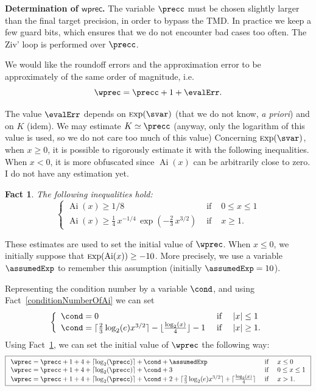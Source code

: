 \documentclass[12pt]{amsart}
\DeclareMathOperator{\Ai}{Ai}
\def\Exp{{\rm \textsc exp}}
\newtheorem{fact}{Fact}
\begin{document}
\noindent\textbf{Determination of $\mathsf{wprec}$.}
\label{linkBetweenPrec}
The variable $\precc$ must be chosen slightly larger than the final target precision, in order to bypass the TMD. In practice we keep a few guard bits, which ensures that we do not encounter bad cases too often. The Ziv' loop is performed over $\precc$.

We would like the roundoff errors and the approximation error to be approximately of the same order of magnitude, i.e.
$$ \wprec = \precc + 1 + \evalErr.$$

The value $\evalErr$ depends on $\Exp(\svar)$ (that we do not know, \emph{a priori}) and on $K$ (idem). We may estimate $K \simeq \precc$ (anyway, only the logarithm of this value is used, so we do not care too much of this value)
Concerning $\Exp(\svar)$, when $x \ge 0$, it is possible to rigorously estimate it with the following inequalities. When $x<0$, it is more obfuscated since $\Ai(x)$ can be arbitrarily close to zero. I do not have any estimation yet.

\begin{fact}
  \label{orderOfMagnitudeAi}
  The following inequalities hold:
$$
\left\{
\begin{array}{ccl}
  \Ai(x) \ge 1/8 & \text{ if } &0\le x\le 1\\
  \Ai(x) \ge \frac{1}{4}\,x^{-1/4}\,\exp\left(-\frac{2}{3} \, x^{3/2}\right) & \text{ if } &x\ge 1.
\end{array}
\right.
$$
\end{fact}


These estimates are used to set the initial value of $\wprec$. When $x \le 0$, we initially suppose that $\Exp(\Ai(x)) \ge -10$. More precisely, we use a variable $\assumedExp$ to remember this assumption (initially $\assumedExp=10$).

Representing the condition number by a variable $\cond$, and using Fact~\ref{conditionNumberOfAi} we can set
$$
\left\{
\begin{array}{lcl}
  \cond = 0 & \text{ if } & |x| \le 1\\
  \cond = \lceil\frac{2}{3}\log_2(e)x^{3/2}\rceil - \lfloor\frac{\log_2(x)}{4}\rfloor - 1 & \text{ if } & |x|\ge 1.
\end{array}
\right.
$$
Using Fact~\ref{orderOfMagnitudeAi}, we can set the initial value of $\wprec$ the following way:
$$
\boxed{
\begin{array}{ll}
  \wprec = \precc + 1 + 4 + \lceil \log_2(\precc)\rceil + \cond + \assumedExp & \text{ if }\quad x \le 0\\
  \wprec = \precc + 1 + 4 + \lceil \log_2(\precc)\rceil + \cond + 3 & \text{ if }\quad  0 \le x \le 1\\
  \wprec = \precc + 1 + 4 + \lceil \log_2(\precc)\rceil + \cond + 2 + \lceil\frac{2}{3}\log_2(e)x^{3/2}\rceil + \lceil\frac{\log_2(x)}{4}\rceil & \text{ if }\quad  x > 1.
\end{array}
}
$$
\end{document}
